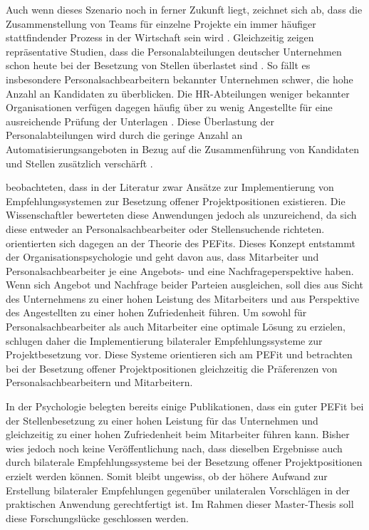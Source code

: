 Auch wenn dieses Szenario noch in ferner Zukunft liegt, zeichnet sich ab, dass die Zusammenstellung von Teams für einzelne Projekte ein immer häufiger stattfindender Prozess in der Wirtschaft sein wird \cite[S. 2]{malinowski:2008}. Gleichzeitig zeigen repräsentative Studien, dass die Personalabteilungen deutscher Unternehmen schon heute bei der Besetzung von Stellen überlastet sind \cite[S. 244]{personalbeschaffung:2017}. So fällt es insbesondere Personalsachbearbeitern bekannter Unternehmen schwer, die hohe Anzahl an Kandidaten zu überblicken. Die HR-Abteilungen weniger bekannter Organisationen verfügen dagegen häufig über zu wenig Angestellte für eine ausreichende Prüfung der Unterlagen \cite[S. 8]{hays:2013}. Diese Überlastung der Personalabteilungen wird durch die geringe Anzahl an Automatisierungsangeboten in Bezug auf die Zusammenführung von Kandidaten und Stellen zusätzlich verschärft \cite[S. 15]{hays:2013}.

\textcite{malinowski:2008} beobachteten, dass in der Literatur zwar Ansätze zur Implementierung von Empfehlungssystemen zur Besetzung offener Projektpositionen existieren. Die Wissenschaftler bewerteten diese Anwendungen jedoch als unzureichend, da sich diese entweder an Personalsachbearbeiter oder Stellensuchende richteten. \textcite{malinowski:2008} orientierten sich dagegen an der Theorie des \acp{PEFit}. Dieses Konzept entstammt der Organisationspsychologie und geht davon aus, dass Mitarbeiter und Personalsachbearbeiter je eine Angebots- und eine Nachfrageperspektive haben. Wenn sich Angebot und Nachfrage beider Parteien ausgleichen, soll dies aus Sicht des Unternehmens zu einer hohen Leistung des Mitarbeiters und aus Perspektive des Angestellten zu einer hohen Zufriedenheit führen. Um sowohl für Personalsachbearbeiter als auch Mitarbeiter eine optimale Lösung zu erzielen, schlugen \textcite{malinowski:2008} daher die Implementierung bilateraler Empfehlungssysteme zur Projektbesetzung vor. Diese Systeme orientieren sich am \ac{PEFit} und betrachten bei der Besetzung offener Projektpositionen gleichzeitig die Präferenzen von Personalsachbearbeitern und Mitarbeitern.

In der Psychologie belegten bereits einige Publikationen, dass ein guter \ac{PEFit} bei der Stellenbesetzung zu einer hohen Leistung für das Unternehmen und gleichzeitig zu einer hohen Zufriedenheit beim Mitarbeiter führen kann. Bisher wies jedoch noch keine Veröffentlichung nach, dass dieselben Ergebnisse auch durch bilaterale Empfehlungssysteme bei der Besetzung offener Projektpositionen erzielt werden können. Somit bleibt ungewiss, ob der höhere Aufwand zur Erstellung bilateraler Empfehlungen gegenüber unilateralen Vorschlägen in der praktischen Anwendung gerechtfertigt ist. Im Rahmen dieser Master-Thesis soll diese Forschungslücke geschlossen werden.

